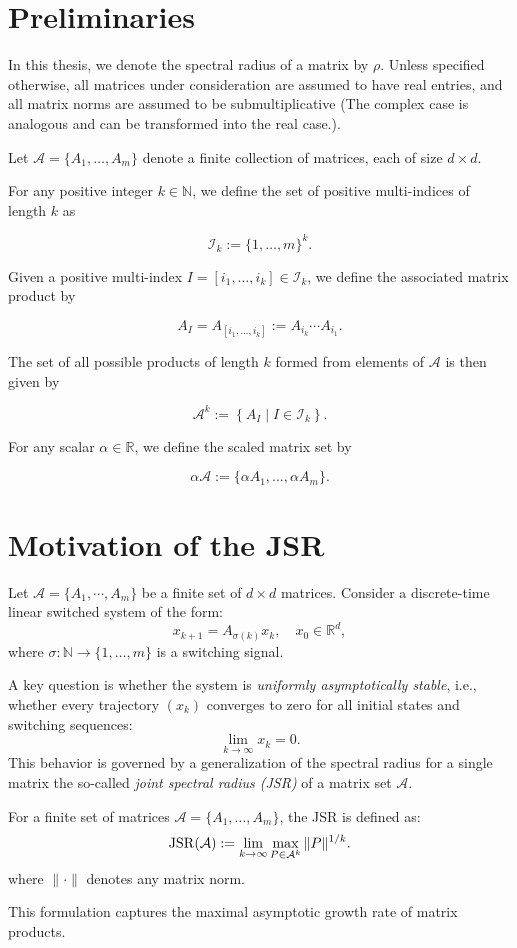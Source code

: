 \section{Preliminaries}

In this thesis, we denote the spectral radius of a matrix by $\rho$. Unless specified otherwise, all matrices under consideration are assumed to have real entries, and all matrix norms are assumed to be submultiplicative (The complex case is analogous and can be transformed into the real case.). 

Let $\mathcal{A} = \{A_1, \dots, A_m\}$ denote a finite collection of matrices, each of size $d \times d$.

For any positive integer $k \in \mathbb{N}$, we define the set of positive multi-indices of length $k$ as

$$
    \mathcal{I}_k := \{1, \dots, m\}^k.
$$

Given a positive multi-index $I = [i_1, \dots, i_k] \in \mathcal{I}_k$, we define the associated matrix product by

$$
    A_I = A_{[i_1, \dots, i_k]} := A_{i_k} \cdots A_{i_1}.
$$

The set of all possible products of length $k$ formed from elements of $\mathcal{A}$ is then given by

$$
    \mathcal{A}^k := \left\{ A_I \mid I \in \mathcal{I}_k \right\}.
$$

For any scalar $\alpha \in \mathbb{R}$, we define the scaled matrix set by

$$
    \alpha \mathcal{A} := \{ \alpha A_1, \dots, \alpha A_m \}.
$$

\section{Motivation of the JSR}

Let $\mathcal{A} = \{A_1, \cdots, A_m\}$ be a finite set of $d\times d$ matrices. 
Consider a discrete-time linear switched system of the form:
\begin{equation} \label{eq:switched_system}
x_{k+1} = A_{\sigma(k)} x_k, \quad x_0 \in \mathbb{R}^d,
\end{equation}
where $\sigma: \mathbb{N} \to \{1, \dots, m\}$ is a switching signal.

A key question is whether the system is \emph{uniformly asymptotically stable}, i.e., whether every trajectory $(x_k)$ converges to zero for all initial states and switching sequences:
\[
\lim_{k \to \infty} x_k = 0.
\]
This behavior is governed by a generalization of the spectral radius for a single matrix the so-called \emph{joint spectral radius (JSR)} of a matrix set $\mathcal{A}$.
\begin{definition}
    For a finite set of matrices $\mathcal{A} = \{A_1, \dots, A_m\}$, the JSR is defined as:
    \begin{equation} \label{eq:jsr_def}
        \operatorname{JSR}(\mathcal{A}) := \lim_{k \to \infty} \max_{P \in \mathcal{A}^k}  \|P\|^{1/k}.
    \end{equation}
    where $\|\cdot\|$ denotes any matrix norm.
\end{definition}
This formulation captures the maximal asymptotic growth rate of matrix products.


